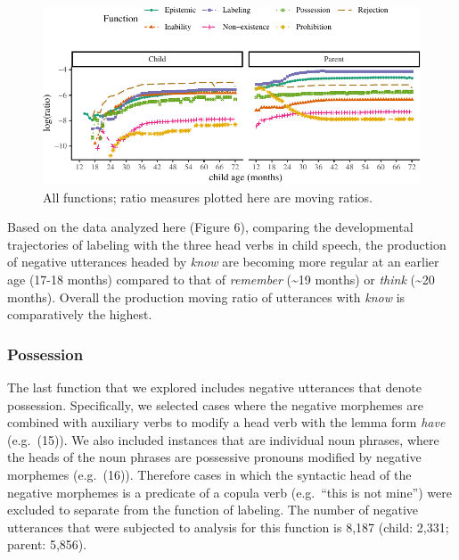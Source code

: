 \documentclass[10pt, letterpaper]{article}
\newenvironment{CodeChunk}{}{}
\begin{document}
\begin{figure}[h!]

\begin{CodeChunk}


\begin{center}\includegraphics{figs/all-1} \end{center}

\end{CodeChunk}

\caption[This image spans both columns]{All functions; ratio measures plotted here are moving ratios.}\label{fig:all}
\end{figure}

Based on the data analyzed here (Figure 6), comparing the developmental
trajectories of labeling with the three head verbs in child speech, the
production of negative utterances headed by \emph{know} are becoming
more regular at an earlier age (17-18 months) compared to that of
\emph{remember} (\textasciitilde19 months) or \emph{think}
(\textasciitilde20 months). Overall the production moving ratio of
utterances with \emph{know} is comparatively the highest.

\hypertarget{possession}{%
\subsubsection{Possession}\label{possession}}

The last function that we explored includes negative utterances that
denote possession. Specifically, we selected cases where the negative
morphemes are combined with auxiliary verbs to modify a head verb with
the lemma form \emph{have} (e.g.~(15)). We also included instances that
are individual noun phrases, where the heads of the noun phrases are
possessive pronouns modified by negative morphemes (e.g.~(16)).
Therefore cases in which the syntactic head of the negative morphemes is
a predicate of a copula verb (e.g.~``this is not mine'') were excluded
to separate from the function of labeling. The number of negative
utterances that were subjected to analysis for this function is 8,187
(child: 2,331; parent: 5,856).
\end{document}
